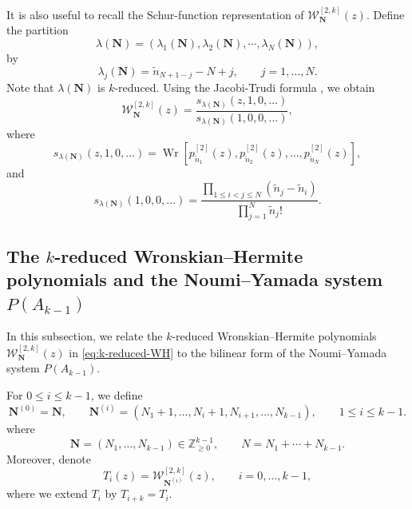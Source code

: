 \documentclass[preprint,3p,10pt]{elsarticle}
\theoremstyle{definition}
\begin{document}
It is also useful to recall the Schur-function representation of
\(\mathcal W_{\mathbf N}^{[2,k]}(z)\).  Define the partition 
\begin{equation}
    \lambda(\mathbf N)=\left(\lambda_1(\mathbf N),\lambda_2(\mathbf N),\cdots,\lambda_N(\mathbf N)\right),
\end{equation}
by
\begin{equation}
\label{eq:k-reduced-partition-from-beta}
    \lambda_j(\mathbf N)
    =
    \tilde n_{N+1-j}-N+j,
    \qquad
    j=1,\ldots,N.
\end{equation}
Note that \(\lambda(\mathbf N)\) is \(k\)-reduced.
Using the Jacobi-Trudi formula \cite{macdonald1998symmetric},
we obtain
\begin{equation}
\label{eq:k-reduced-WH-as-Schur}
    \mathcal W_{\mathbf N}^{[2,k]}(z)
    =
    \frac{
        s_{\lambda(\mathbf N)}(z,1,0,\ldots)
    }{
        s_{\lambda(\mathbf N)}(1,0,0,\ldots)
    },
\end{equation}
where
\begin{equation}
\label{eq:Schur-Wronskian-k-reduced}
    s_{\lambda(\mathbf N)}(z,1,0,\ldots)
    =
    \operatorname{Wr}
    \left[
        p_{\tilde n_1}^{[2]}(z),
        p_{\tilde n_2}^{[2]}(z),
        \ldots,
        p_{\tilde n_N}^{[2]}(z)
    \right],
\end{equation}
and
\begin{equation}
\label{eq:Schur-denominator-k-reduced}
    s_{\lambda(\mathbf N)}(1,0,0,\ldots)
    =
    \frac{
        \prod_{1\le i<j\le N}(\tilde n_j-\tilde n_i)
    }{
        \prod_{j=1}^{N}\tilde n_j!
    }.
\end{equation}


\subsection{The \texorpdfstring{\(k\)-reduced}{k-reduced}
Wronskian--Hermite polynomials and the Noumi--Yamada system
\texorpdfstring{\(P(A_{k-1})\)}{P(A\_{k-1})}}
\label{subsec:k-reduced-WH-Painleve}
In this subsection, we relate the \(k\)-reduced Wronskian--Hermite polynomials $\mathcal W_{\mathbf N}^{[2,k]}(z)$ in
\eqref{eq:k-reduced-WH} to the bilinear form of the Noumi--Yamada system \(P(A_{k-1})\).



For \(0\le i\le k-1\), we define
\begin{equation}
\label{eq:shifted-block-vector}
    \mathbf N^{(0)}=\mathbf N,
    \qquad
    \mathbf N^{(i)}
    =
    (N_1+1,\ldots,N_i+1,N_{i+1},\ldots,N_{k-1}),
    \qquad
    1\le i\le k-1.
\end{equation}
where
\begin{equation}
    \mathbf N=(N_1,\ldots,N_{k-1})\in\mathbb Z_{\ge0}^{k-1},
    \qquad
    N=N_1+\cdots+N_{k-1}.
\end{equation}
Moreover, denote
\begin{equation}
\label{eq:k-reduced-Ti-def}
    T_i(z)
    =
    \mathcal W_{\mathbf N^{(i)}}^{[2,k]}(z),
    \qquad
    i=0,\ldots,k-1,
\end{equation}
where we extend \(T_i\) by \(T_{i+k}=T_i\).
\end{document}
